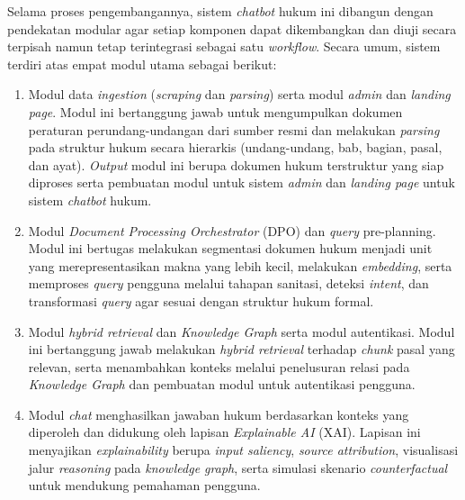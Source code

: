 Selama proses pengembangannya, sistem \emph{chatbot} hukum ini dibangun dengan pendekatan modular agar setiap komponen dapat dikembangkan dan diuji secara terpisah namun tetap terintegrasi sebagai satu \emph{workflow}. Secara umum, sistem terdiri atas empat modul utama sebagai berikut:
\begin{enumerate}
    \item Modul data \emph{ingestion} (\emph{scraping} dan \emph{parsing}) serta modul \emph{admin} dan \emph{landing page}. Modul ini bertanggung jawab untuk mengumpulkan dokumen peraturan perundang-undangan dari sumber resmi dan melakukan \emph{parsing} pada struktur hukum secara hierarkis (undang-undang, bab, bagian, pasal, dan ayat). \emph{Output} modul ini berupa dokumen hukum terstruktur yang siap diproses serta pembuatan modul untuk sistem \emph{admin} dan \emph{landing page} untuk sistem \emph{chatbot} hukum.
    \item Modul \emph{Document Processing Orchestrator} (DPO) dan \emph{query} pre-planning. Modul ini bertugas melakukan segmentasi dokumen hukum menjadi unit yang merepresentasikan makna yang lebih kecil, melakukan \emph{embedding}, serta memproses \emph{query} pengguna melalui tahapan sanitasi, deteksi \emph{intent}, dan transformasi \emph{query} agar sesuai dengan struktur hukum formal.
    \item Modul \emph{hybrid retrieval} dan \emph{Knowledge Graph} serta modul autentikasi. Modul ini bertanggung jawab melakukan \emph{hybrid retrieval} terhadap \emph{chunk} pasal yang relevan, serta menambahkan konteks melalui penelusuran relasi pada \emph{Knowledge Graph} dan pembuatan modul untuk autentikasi pengguna.
    \item Modul \emph{chat} menghasilkan jawaban hukum berdasarkan konteks yang diperoleh dan didukung oleh lapisan \emph{Explainable AI} (XAI). Lapisan ini menyajikan \emph{explainability} berupa \emph{input saliency}, \emph{source attribution}, visualisasi jalur \emph{reasoning} pada \emph{knowledge graph}, serta simulasi skenario \emph{counterfactual} untuk mendukung pemahaman pengguna.
\end{enumerate}

